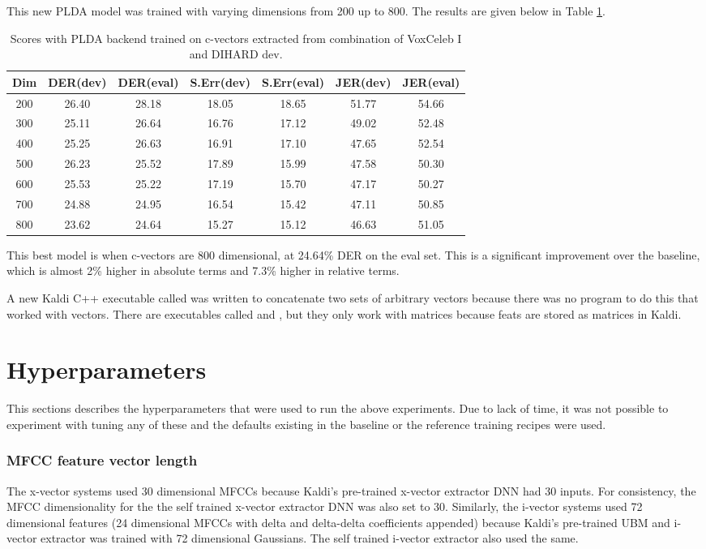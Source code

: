 	This new PLDA model was trained with varying dimensions from 200 up to 800. The results are given below in Table \ref{table-cvector}.
	\begin{table}[h]
		\centering
		\begin{tabular}{|c|c|c|c|c|c|c|}
			\hline
			Dim & DER(dev) & DER(eval) & S.Err(dev) & S.Err(eval) & JER(dev) & JER(eval) \\
			\hline
			200 & 26.40 & 28.18 & 18.05 & 18.65 & 51.77 & 54.66 \\
			300 & 25.11 & 26.64 & 16.76 & 17.12 & 49.02 & 52.48 \\
			400 & 25.25 & 26.63 & 16.91 & 17.10 & 47.65 & 52.54 \\
			500 & 26.23 & 25.52 & 17.89 & 15.99 & 47.58 & 50.30 \\
			600 & 25.53 & 25.22 & 17.19 & 15.70 & 47.17 & 50.27 \\
			700 & 24.88 & 24.95 & 16.54 & 15.42 & 47.11 & 50.85 \\
			800 & 23.62 & 24.64 & 15.27 & 15.12 & 46.63 & 51.05 \\
			\hline
		\end{tabular}
		\caption{Scores with PLDA backend trained on c-vectors extracted from combination of VoxCeleb I and DIHARD dev.}
		\label{table-cvector}
	\end{table}

	This best model is when c-vectors are 800 dimensional, at 24.64\% DER on the eval set. This is a significant improvement over the baseline, which is almost 2\% higher in absolute terms and 7.3\% higher in relative terms.
	
	A new Kaldi C++ executable called  was written to concatenate two sets of arbitrary vectors because there was no program to do this that worked with vectors. There are executables called  and , but they only work with matrices because feats are stored as matrices in Kaldi.
	
	\section{Hyperparameters}
		This sections describes the hyperparameters that were used to run the above experiments. Due to lack of time, it was not possible to experiment with tuning any of these and the defaults existing in the baseline or the reference training recipes were used.\\
		\subsubsection{MFCC feature vector length}
			The x-vector systems used 30 dimensional MFCCs because Kaldi's pre-trained x-vector extractor DNN had 30 inputs. For consistency, the MFCC dimensionality for the the self trained x-vector extractor DNN was also set to 30.
			Similarly, the i-vector systems used 72 dimensional features (24 dimensional MFCCs with delta and delta-delta coefficients appended) because Kaldi's pre-trained UBM and i-vector extractor was trained with 72 dimensional Gaussians. The self trained i-vector extractor also used the same.
